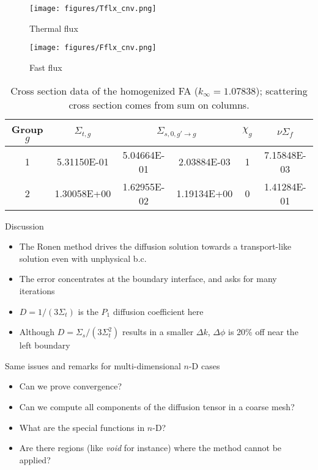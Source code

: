 \begin{frame}[allowframebreaks]
  \begin{figure}
    \texttt{[image: figures/Tflx\_cnv.png]}
    \caption{Thermal flux}
  \end{figure}

  \begin{figure}
    \texttt{[image: figures/Fflx\_cnv.png]}
    \caption{Fast flux}
  \end{figure}

  \begin{table}
  \caption{Cross section data of the homogenized FA ($k_{\infty} = 1.07838$); scattering cross section comes from sum on columns.}
  \begin{tabular}{*{6}{c}}\hline \hline
  Group $g$ & $\Sigma_{t,g}$ & \multicolumn{2}{c}{$\Sigma_{s,0,g' \rightarrow g}$} &
  $\chi_g$ & $\nu\Sigma_f$ \\ \hline
  1 & 5.31150E-01 & 5.04664E-01 & 2.03884E-03 & 1 & 7.15848E-03 \\
  2 & 1.30058E+00 & 1.62955E-02 & 1.19134E+00 & 0 & 1.41284E-01 \\
  \hline \hline
  \end{tabular}
  \end{table}

  \begin{exampleblock}{Discussion}\tt
  \begin{itemize}
    \item The Ronen method drives the diffusion solution towards a transport-like solution even with unphysical b.c.
    \item The error concentrates at the boundary interface, and asks for many iterations
    \item $D=1/(3\Sigma_t)$ is the $P_1$ diffusion coefficient here
    \item Although $D=\Sigma_s/(3\Sigma_t^2)$ results in a smaller $\Delta k$, $\Delta \phi$ is 20\% off near the left boundary
  \end{itemize}
  \end{exampleblock}

  \begin{alertblock}{Same issues and remarks for multi-dimensional $n$-D cases}\tt
  \begin{itemize}
    \item Can we prove convergence?
    \item Can we compute all components of the diffusion tensor in a coarse mesh?
    \item What are the special functions in $n$-D?
    \item Are there regions (like \emph{void} for instance) where the method cannot be applied?
  \end{itemize}
  \end{alertblock}
\end{frame}
